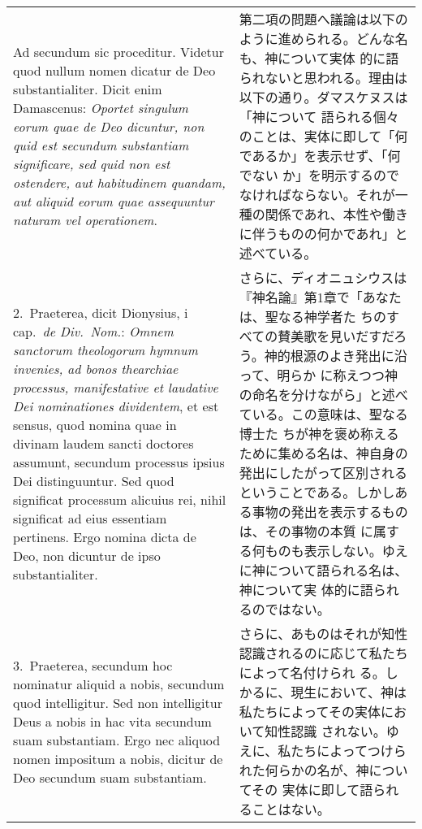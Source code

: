 \documentclass[10pt]{jsarticle}
\begin{document}
\begin{longtable}{p{21em}p{21em}}

{\sc Ad secundum sic proceditur}. Videtur quod nullum nomen dicatur de
Deo substantialiter. Dicit enim Damascenus: {\it Oportet singulum
eorum quae de Deo dicuntur, non quid est secundum substantiam
significare, sed quid non est ostendere, aut habitudinem quandam, aut
aliquid eorum quae assequuntur naturam vel operationem}.

&

第二項の問題へ議論は以下のように進められる。どんな名も、神について実体
的に語られないと思われる。理由は以下の通り。ダマスケヌスは「神について
語られる個々のことは、実体に即して「何であるか」を表示せず、「何でない
か」を明示するのでなければならない。それが一種の関係であれ、本性や働き
に伴うものの何かであれ」と述べている。

\\

2.~{\sc Praeterea}, dicit Dionysius, {\sc i} cap.\ {\it de Div.\
Nom.}: {\it Omnem sanctorum theologorum hymnum invenies, ad bonos
thearchiae processus, manifestative et laudative Dei nominationes
dividentem}, et est sensus, quod nomina quae in divinam laudem sancti
doctores assumunt, secundum processus ipsius Dei distinguuntur. Sed
quod significat processum alicuius rei, nihil significat ad eius
essentiam pertinens. Ergo nomina dicta de Deo, non dicuntur de ipso
substantialiter.

&

さらに、ディオニュシウスは『神名論』第1章で「あなたは、聖なる神学者た
ちのすべての賛美歌を見いだすだろう。神的根源のよき発出に沿って、明らか
に称えつつ神の命名を分けながら」と述べている。この意味は、聖なる博士た
ちが神を褒め称えるために集める名は、神自身の発出にしたがって区別される
ということである。しかしある事物の発出を表示するものは、その事物の本質
に属する何ものも表示しない。ゆえに神について語られる名は、神について実
体的に語られるのではない。

\\

3.~{\sc Praeterea}, secundum hoc nominatur aliquid a nobis, secundum
quod intelligitur. Sed non intelligitur Deus a nobis in hac vita
secundum suam substantiam. Ergo nec aliquod nomen impositum a nobis,
dicitur de Deo secundum suam substantiam.

&

さらに、あものはそれが知性認識されるのに応じて私たちによって名付けられ
る。しかるに、現生において、神は私たちによってその実体において知性認識
されない。ゆえに、私たちによってつけられた何らかの名が、神についてその
実体に即して語られることはない。


\end{longtable}
\end{document}
